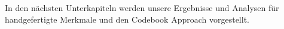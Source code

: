 
In den nächsten Unterkapiteln werden unsere Ergebnisse und Analysen für handgefertigte Merkmale und den Codebook Approach vorgestellt. \\










